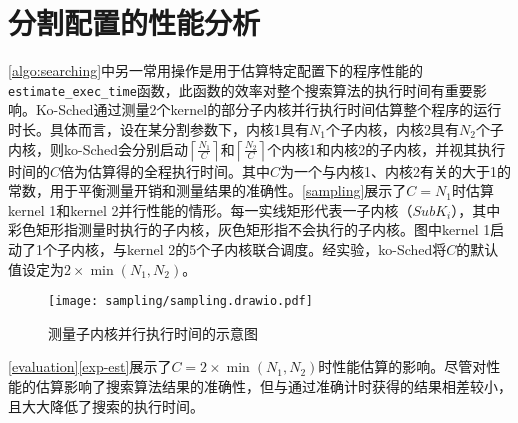 \section{分割配置的性能分析}\label{sec:profile}

\autoref{algo:searching}中另一常用操作是用于估算特定配置下的程序性能的\texttt{estimate\_exec\_time}函数，此函数的效率对整个搜索算法的执行时间有重要影响。Ko-Sched通过测量2个kernel的部分子内核并行执行时间估算整个程序的运行时长。具体而言，设在某分割参数下，内核1具有$N_1$个子内核，内核2具有$N_2$个子内核，则ko-Sched会分别启动$\left\lceil \frac{N_1}{C}\right\rceil $和$\left\lceil \frac{N_2}{C}\right\rceil $个内核1和内核2的子内核，并视其执行时间的$C$倍为估算得的全程执行时间。其中$C$为一个与内核1、内核2有关的大于1的常数，用于平衡测量开销和测量结果的准确性。\autoref{sampling}展示了$C=N_1$时估算kernel 1和kernel 2并行性能的情形。每一实线矩形代表一子内核（$SubK_{i}$），其中彩色矩形指测量时执行的子内核，灰色矩形指不会执行的子内核。图中kernel 1启动了1个子内核，与kernel 2的5个子内核联合调度。经实验，ko-Sched将$C$的默认值设定为$2 \times \min \left(N_1, N_2\right)$。

\begin{figure}[htbp]
    \centering
    \texttt{[image: sampling/sampling.drawio.pdf]}
    \caption{测量子内核并行执行时间的示意图}
    \label{sampling}
\end{figure}

\autoref{evaluation}\autoref{exp-est}展示了$C=2 \times \min \left(N_1, N_2\right)$时性能估算的影响。尽管对性能的估算影响了搜索算法结果的准确性，但与通过准确计时获得的结果相差较小，且大大降低了搜索的执行时间。